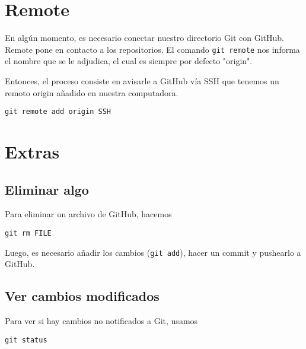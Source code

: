 \documentclass[11pt]{article}
\begin{document}
\section{Remote}
\label{sec:org5543a99}

En algún momento, es necesario conectar nuestro directorio Git con
GitHub. Remote pone en contacto a los repositorios. El comando \texttt{git
remote} nos informa el nombre que se le adjudica, el cual es siempre
por defecto "origin".

Entonces, el proceso consiste en avisarle a GitHub vía SSH que tenemos un
remoto origin añadido en nuestra computadora. 
\begin{verbatim}
git remote add origin SSH
\end{verbatim}


\section{Extras}
\label{sec:org4dc52a1}

\subsection{Eliminar algo}
\label{sec:orgb39bfeb}
Para eliminar un archivo de GitHub, hacemos
\begin{verbatim}
git rm FILE
\end{verbatim}

Luego, es necesario añadir los cambios (\texttt{git add}), hacer un commit y
pushearlo a GitHub.

\subsection{Ver cambios modificados}
\label{sec:orgbd7d737}

Para ver si hay cambios no notificados a Git, usamos
\begin{verbatim}
git status
\end{verbatim}
\end{document}
